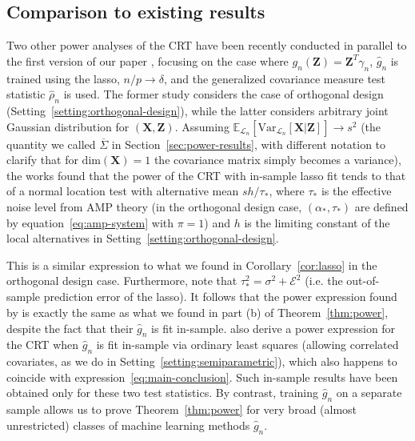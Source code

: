 \documentclass[12pt]{article}
\theoremstyle{definition}
\theoremstyle{remark}
\newcommand{\prx}{\bm X}
\newcommand{\prz}{\bm Z}
\begin{document}
\subsection{Comparison to existing results} \label{sec:comparison-to-existing-results-4}

Two other power analyses of the CRT have been recently conducted \cite{Wang2020b, Celentano2020} in parallel to the first version of our paper \cite{Katsevich2020a}, focusing on the case where $g_n(\prz) = \prz^T \gamma_n$, $\widehat g_n$ is trained using the lasso, $n/p \rightarrow \delta$, and the generalized covariance measure test statistic $\widehat \rho_n$ is used. The former study considers the case of orthogonal design (Setting~\ref{setting:orthogonal-design}), while the latter considers arbitrary joint Gaussian distribution for $(\prx,\prz)$. Assuming $\mathbb E_{\mathcal L_n}[\text{Var}_{\mathcal L_n}[\prx|\prz]] \rightarrow s^2$ (the quantity we called $\overline \Sigma$ in Section~\ref{sec:power-results}, with different notation to clarify that for $\text{dim}(\prx) = 1$ the covariance matrix simply becomes a variance), the works \cite{Wang2020b, Celentano2020} found that the power of the CRT with in-sample lasso fit tends to that of a normal location test with alternative mean $sh/\tau_*$, where $\tau_*$ is the effective noise level from AMP theory (in the orthogonal design case, $(\alpha_*, \tau_*)$ are defined by equation~\eqref{eq:amp-system} with $\pi = 1$) and $h$ is the limiting constant of the local alternatives in Setting~\ref{setting:orthogonal-design}. 

This is a similar expression to what we found in Corollary~\ref{cor:lasso} in the orthogonal design case. Furthermore, note that $\tau_*^2 = \sigma^2 + \mathcal E^2$ (i.e. the out-of-sample prediction error of the lasso). It follows that the power expression found by \cite{Wang2020b, Celentano2020} is exactly the same as what we found in part (b) of Theorem~\ref{thm:power}, despite the fact that their $\widehat g_n$ is fit in-sample. 
\cite{Wang2020b} also derive a power expression for the CRT when $\widehat g_n$ is fit in-sample via ordinary least squares (allowing correlated covariates, as we do in Setting~\ref{setting:semiparametric}), which also happens to coincide with expression~\eqref{eq:main-conclusion}. Such in-sample results have been obtained only for these two test statistics.
By contrast, training $\widehat g_n$ on a separate sample allows us to prove Theorem~\ref{thm:power} for very broad (almost unrestricted) classes of machine learning methods $\widehat g_n$.
\end{document}
